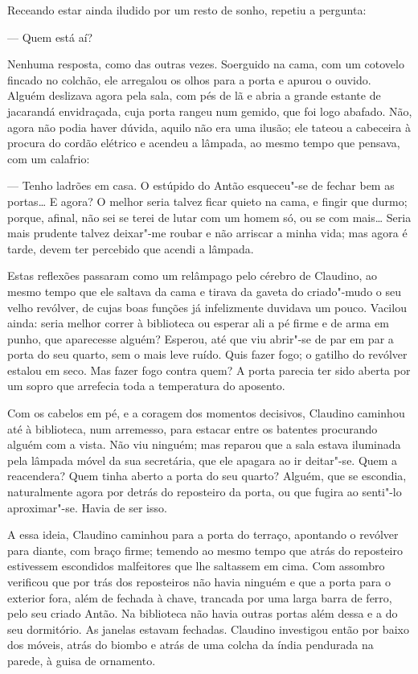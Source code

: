 Receando estar ainda iludido por um resto de sonho, repetiu a pergunta:

--- Quem está aí?

Nenhuma resposta, como das outras vezes. Soerguido na cama, com um
cotovelo fincado no colchão, ele arregalou os olhos para a porta e
apurou o ouvido. Alguém deslizava agora pela sala, com pés de lã e abria
a grande estante de jacarandá envidraçada,
cuja porta rangeu num gemido, que foi logo abafado. Não, agora não podia
haver dúvida,
aquilo não era uma ilusão; ele tateou a cabeceira à procura do cordão
elétrico e acendeu a lâmpada, ao mesmo tempo que pensava, com um
calafrio:

--- Tenho ladrões em casa. O estúpido do Antão esqueceu"-se de fechar bem
as portas\ldots{} E agora? O melhor seria talvez ficar quieto na cama, e
fingir que durmo; porque, afinal, não sei se terei de lutar com um homem
só, ou se com mais\ldots{} Seria mais prudente talvez deixar"-me roubar e não
arriscar a minha vida; mas agora é tarde, devem ter percebido que acendi
a lâmpada.

Estas reflexões passaram como um relâmpago pelo cérebro de Claudino, ao
mesmo tempo que ele saltava da cama e tirava da gaveta do criado"-mudo o
seu velho revólver, de cujas boas funções já infelizmente duvidava um
pouco. Vacilou ainda: seria
melhor correr à biblioteca ou esperar ali a pé firme e de arma em punho,
que aparecesse alguém? Esperou, até que viu abrir"-se de par em par a
porta do seu quarto, sem o mais leve ruído. Quis fazer fogo; o gatilho
do revólver estalou em seco. Mas fazer fogo contra quem? A porta parecia
ter sido aberta por um sopro que arrefecia toda a temperatura do
aposento.

Com os cabelos em pé, e a coragem dos momentos decisivos, Claudino
caminhou até à biblioteca, num arremesso, para estacar entre os batentes
procurando alguém com a vista. Não viu ninguém; mas reparou que a sala
estava iluminada pela lâmpada móvel da sua secretária, que ele apagara
ao ir deitar"-se. Quem a reacendera? Quem tinha aberto a porta do seu
quarto? Alguém, que se escondia, naturalmente agora por detrás do
reposteiro da porta, ou que fugira ao senti"-lo aproximar"-se. Havia de
ser isso.

A essa ideia, Claudino caminhou para a porta do terraço, apontando o
revólver para diante, com braço firme; temendo ao mesmo tempo que atrás
do reposteiro estivessem escondidos malfeitores que lhe saltassem em
cima. Com assombro verificou que por trás dos reposteiros não havia
ninguém e que a porta para o exterior fora, além de fechada à chave,
trancada por uma larga barra de ferro, pelo seu criado Antão. Na
biblioteca não havia outras portas além dessa e a do seu dormitório. As
janelas estavam fechadas. Claudino investigou então por baixo dos
móveis, atrás do biombo e atrás de uma colcha da índia pendurada na
parede, à guisa de ornamento.

